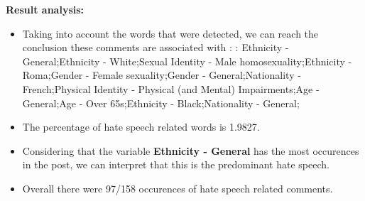 \documentclass[11pt]{article}
\newlength\mylength
\begin{document}
\begin{center}
\begin{longtable}{|C{.50\mylength}|C{.30\mylength}|C{.15\mylength}|C{.15\mylength}|C{.15\mylength}|}
\end{longtable}
\end{center}


\textbf{\Large Result analysis:}

\begin{itemize}\item Taking into account the words that were detected, we can reach the conclusion these comments are associated with : : Ethnicity - General;Ethnicity - White;Sexual Identity - Male homosexuality;Ethnicity - Roma;Gender - Female sexuality;Gender - General;Nationality - French;Physical Identity - Physical (and Mental) Impairments;Age - General;Age - Over 65s;Ethnicity - Black;Nationality - General;%

\item The percentage of hate speech related words is 1.9827.

\item Considering that the variable \textbf{Ethnicity - General} has the most occurences in the post, we can interpret that this is the predominant hate speech.

\item Overall there were 97/158 occurences of hate speech related comments.\end{itemize}
\end{document}
